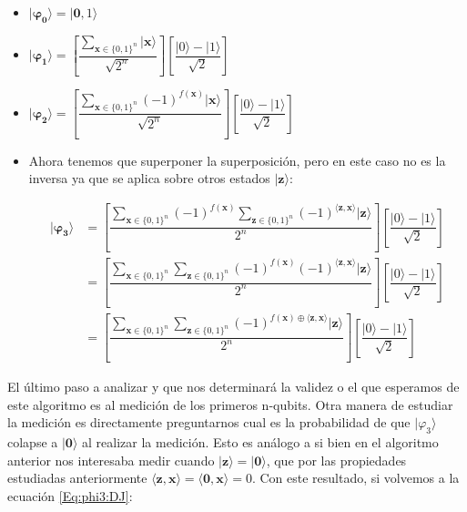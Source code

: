  \begin{itemize}
     \item $\mathbf{|\varphi_{0}\rangle} = |\mathbf{0},1\rangle$

    \vspace{5pt}

    \item  $\mathbf{|\varphi_{1}\rangle} = \left[ \dfrac{\sum_{\mathbf{x} \in \{0,1\}^{n}}|\mathbf{x}\rangle}{\sqrt{2^{n}}}\right] \left[ \dfrac{|0\rangle - |1\rangle}{\sqrt{2}}\right]$

    \vspace{5pt}

    \item $\mathbf{|\varphi_{2}\rangle} =\left[ \dfrac{\sum_{\mathbf{x} \in \{0,1\}^{n}}(-1)^{f(\mathbf{x})}|\mathbf{x}\rangle}{\sqrt{2^{n}}}\right] \left[ \dfrac{|0\rangle - |1\rangle}{\sqrt{2}}\right]$

    \vspace{5pt}

    \item Ahora tenemos que superponer la superposición, pero en este caso no es la inversa ya que se aplica sobre otros estados $|\mathbf{z}\rangle$:

    \begin{equation}\label{Eq:phi3:DJ}
        \begin{split}\mathbf{|\varphi_{3}\rangle} &= \left[ \dfrac{\sum_{\mathbf{x} \in \{0,1\}^{n}}(-1)^{f(\mathbf{x})}\sum_{\mathbf{z} \in \{0,1\}^{n}}(-1)^{\langle\mathbf{z},\mathbf{x}\rangle}|\mathbf{z}\rangle}{2^{n}}\right] \left[ \dfrac{|0\rangle - |1\rangle}{\sqrt{2}}\right] \\ &= \left[ \dfrac{\sum_{\mathbf{x} \in \{0,1\}^{n}}\sum_{\mathbf{z} \in \{0,1\}^{n}}(-1)^{f(\mathbf{x})}(-1)^{\langle\mathbf{z},\mathbf{x}\rangle}|\mathbf{z}\rangle}{2^{n}}\right] \left[ \dfrac{|0\rangle - |1\rangle}{\sqrt{2}}\right] \\ &= \left[ \dfrac{\sum_{\mathbf{x} \in \{0,1\}^{n}}\sum_{\mathbf{z} \in \{0,1\}^{n}}(-1)^{f(\mathbf{x})\oplus\langle\mathbf{z},\mathbf{x}\rangle}|\mathbf{z}\rangle}{2^{n}}\right] \left[ \dfrac{|0\rangle - |1\rangle}{\sqrt{2}}\right]
        \end{split}
    \end{equation}
 \end{itemize}

 El último paso a analizar y que nos determinará la validez o el que esperamos de este algoritmo es al medición de los primeros n-qubits. Otra manera de estudiar la medición es directamente preguntarnos cual es la probabilidad de que $|\varphi_{3}\rangle$ colapse a $|\mathbf{0}\rangle$ al realizar la medición. Esto es análogo a si bien en el algoritmo anterior nos interesaba medir cuando $|\mathbf{z}\rangle=|\mathbf{0}\rangle$, que por las propiedades estudiadas anteriormente $\langle\mathbf{z},\mathbf{x}\rangle=\langle\mathbf{0},\mathbf{x}\rangle=0$. Con este resultado, si volvemos a la ecuación \ref{Eq:phi3:DJ}:

